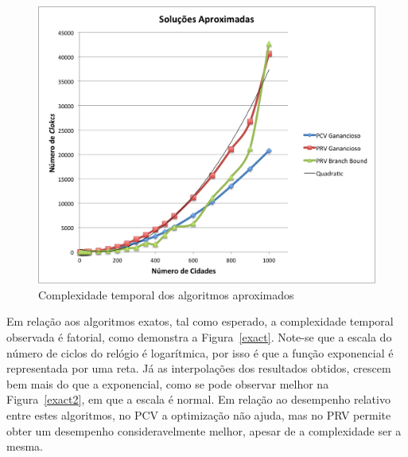 \documentclass[12pt,a4paper,reqno]{report}
\numberwithin{equation}{section}
\begin{document}
\begin{figure} [ht]
\begin{center}
\includegraphics[width=15cm]{aprox.png}
\caption{Complexidade temporal dos algoritmos aproximados}
\label{aprox}
\end{center}
\end{figure}

Em relação aos algoritmos exatos, tal como esperado, a complexidade temporal observada é fatorial, como demonstra a Figura~\ref{exact}. Note-se que a escala do número de ciclos do relógio é logarítmica, por isso é que a função exponencial é representada por uma reta. Já as interpolações dos resultados obtidos, crescem bem mais do que a exponencial, como se pode observar melhor na Figura~\ref{exact2}, em que a escala é normal. Em relação ao desempenho relativo entre estes algoritmos, no PCV a optimização não ajuda, mas no PRV permite obter um desempenho consideravelmente melhor, apesar de a complexidade ser a mesma.
\end{document}
